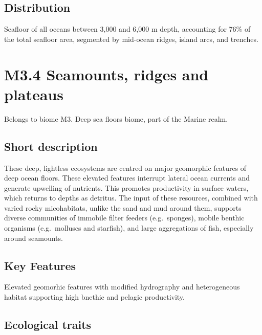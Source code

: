 \documentclass[
  letterpaper,
  DIV=11,
  numbers=noendperiod]{scrartcl}
\begin{document}
\subsection{Distribution}\label{distribution-42}

Seafloor of all oceans between 3,000 and 6,000 m depth, accounting for
76\% of the total seafloor area, segmented by mid-ocean ridges, island
arcs, and trenches.

\section{M3.4 Seamounts, ridges and
plateaus}\label{m3.4-seamounts-ridges-and-plateaus}

Belongs to biome M3. Deep sea floors biome, part of the Marine realm.

\subsection{Short description}\label{short-description-43}

These deep, lightless ecosystems are centred on major geomorphic
features of deep ocean floors. These elevated features interrupt lateral
ocean currents and generate upwelling of nutrients. This promotes
productivity in surface waters, which returns to depths as detritus. The
input of these resources, combined with varied rocky micohabitats,
unlike the sand and mud around them, supports diverse communities of
immobile filter feeders (e.g.~sponges), mobile benthic organisms
(e.g.~molluscs and starfish), and large aggregations of fish, especially
around seamounts.

\subsection{Key Features}\label{key-features-43}

Elevated geomorhic features with modified hydrography and heterogeneous
habitat supporting high bnethic and pelagic productivity.

\subsection{Ecological traits}\label{ecological-traits-43}
\end{document}
